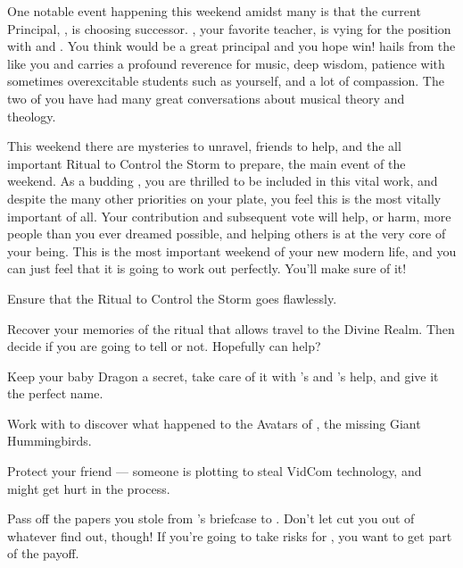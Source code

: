 \documentclass[char]{GL2020}
\begin{document}
{One notable event happening this weekend amidst many is that the current Principal, \cPrincipal{\full}, is choosing \cPrincipal{\their} successor. \cMusic{\full}, your favorite teacher, is vying for the position with \cBeetle{\full} and \cChupSecond{\full}. You think \cMusic{} would be a great principal and you hope \cMusic{\they} win\cMusic{\verbs}! \cMusic{} hails from the \pFarm{} like you and carries a profound reverence for music, deep wisdom, patience with sometimes overexcitable students such as yourself, and a lot of compassion. The two of you have had many great conversations about musical theory and theology.

This weekend there are mysteries to unravel, friends to help, and the all important Ritual to Control the Storm to prepare, the main event of the weekend. As a budding \cDisney{\cleric}, you are thrilled to be included in this vital work, and despite the many other priorities on your plate, you feel this is the most vitally important of all. Your contribution and subsequent vote will help, or harm, more people than you ever dreamed possible, and helping others is at the very core of your being. This is the most important weekend of your new modern life, and you can just feel that it is going to work out perfectly. You'll make sure of it!

\begin{itemz}
    \item Ensure that the Ritual to Control the Storm goes flawlessly.
    \item Recover your memories of the ritual that allows travel to the Divine Realm. Then decide if you are going to tell \cWildCard{} or not. Hopefully \cTechStar{} can help?
    \item Keep your baby Dragon a secret, take care of it with \cPirateChild{}'s and \cAdopted{}'s help, and give it the perfect name.
    \item Work with \cJuniorStatesman{} to discover what happened to the Avatars of \cFarmGod{}, the missing Giant Hummingbirds.
    \item Protect your friend \cTechStar{} — someone is plotting to steal \cTechStar{\their} VidCom technology, and \cTechStar{} might get hurt in the process.
    \item Pass off the papers you stole from \cBunker{}'s briefcase to \cWildCard{}. Don't let \cWildCard{\them} cut you out of whatever \cWildCard{\they} find\cWildCard{\verbs} out, though! If you're going to take risks for \cWildCard{\them}, you want to get part of the payoff.
\end{itemz}

}
\end{document}
